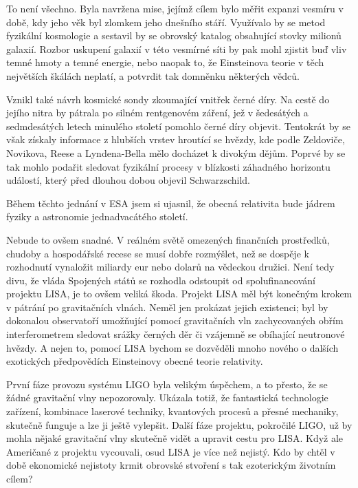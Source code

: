   To není všechno. Byla navržena mise, jejímž cílem bylo měřit expanzi vesmíru v době, kdy jeho věk
  byl zlomkem jeho dnešního stáří. Využívalo by se metod fyzikální kosmologie a sestavil by se
  obrovský katalog obsahující stovky milionů galaxií. Rozbor uskupení galaxií v této vesmírné síti
  by pak mohl zjistit buď vliv temné hmoty a temné energie, nebo naopak to, že Einsteinova teorie v
  těch největších škálách neplatí, a potvrdit tak domněnku některých vědců.
  
  Vznikl také návrh kosmické sondy zkoumající vnitřek černé díry. Na cestě do jejího nitra by
  pátrala po silném rentgenovém záření, jež v šedesátých a sedmdesátých letech minulého století
  pomohlo černé díry objevit. Tentokrát by se však získaly informace z hlubších vrstev hroutící se
  hvězdy, kde podle Zeldoviče, Novikova, Reese a Lyndena-Bella mělo docházet k divokým dějům. Poprvé
  by se tak mohlo podařit sledovat fyzikální procesy v blízkosti záhadného horizontu událostí, který
  před dlouhou dobou objevil Schwarzschild. 
  
  Během těchto jednání v ESA jsem si ujasnil, že obecná relativita bude jádrem fyziky a astronomie
  jednadvacátého století. 
  
  Nebude to ovšem snadné. V reálném světě omezených finančních prostředků, chudoby a hospodářské
  recese se musí dobře rozmýšlet, než se dospěje k rozhodnutí vynaložit miliardy eur nebo dolarů na
  vědeckou družici. Není tedy divu, že vláda Spojených států se rozhodla odstoupit od
  spolufinancování projektu LISA, je to ovšem veliká škoda. Projekt LISA měl být konečným krokem v
  pátrání po gravitačních vlnách. Neměl jen prokázat jejich existenci; byl by dokonalou observatoří
  umožňující pomocí gravitačních vln zachycovaných obřím interferometrem sledovat srážky černých děr
  či vzájemně se obíhající neutronové hvězdy. A nejen to, pomocí LISA bychom se dozvěděli mnoho
  nového o dalších exotických předpovědích Einsteinovy obecné teorie relativity. 
  
  První fáze provozu systému LIGO byla velikým úspěchem, a to přesto, že se žádné gravitační vlny
  nepozorovaly. Ukázala totiž, že fantastická technologie zařízení, kombinace laserové techniky,
  kvantových procesů a přesné mechaniky, skutečně funguje a lze ji ještě vylepšit. Další fáze
  projektu, pokročilé LIGO, už by mohla nějaké gravitační vlny skutečně vidět a upravit cestu pro
  LISA. Když ale Američané z projektu vycouvali, osud LISA je více než nejistý. Kdo by chtěl v době
  ekonomické nejistoty krmit obrovské stvoření s tak ezoterickým životním cílem? 
  
